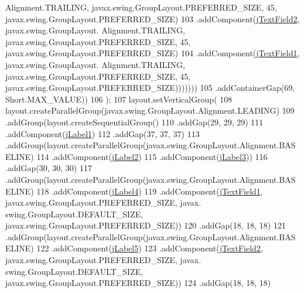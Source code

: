 \begin{DoxyCode}
      Alignment.TRAILING, javax.swing.GroupLayout.PREFERRED\_SIZE, 45, javax.swing.GroupLayout.PREFERRED\_SIZE)
103                                         .addComponent(\mbox{\hyperlink{classsoftware_1_1ponernotas_a3cc94d5b5bd1181f042f71bcbe418e5f}{jTextField2}}, javax.swing.GroupLayout.
      Alignment.TRAILING, javax.swing.GroupLayout.PREFERRED\_SIZE, 45, javax.swing.GroupLayout.PREFERRED\_SIZE)
104                                         .addComponent(\mbox{\hyperlink{classsoftware_1_1ponernotas_a6ea3d65f0c7fddc1b3c983e9ed0e6939}{jTextField1}}, javax.swing.GroupLayout.
      Alignment.TRAILING, javax.swing.GroupLayout.PREFERRED\_SIZE, 45, javax.swing.GroupLayout.PREFERRED\_SIZE)))))))
105                 .addContainerGap(69, Short.MAX\_VALUE))
106         );
107         layout.setVerticalGroup(
108             layout.createParallelGroup(javax.swing.GroupLayout.Alignment.LEADING)
109             .addGroup(layout.createSequentialGroup()
110                 .addGap(29, 29, 29)
111                 .addComponent(\mbox{\hyperlink{classsoftware_1_1ponernotas_ac17144972e22b9105abd7154befd195a}{jLabel1}})
112                 .addGap(37, 37, 37)
113                 .addGroup(layout.createParallelGroup(javax.swing.GroupLayout.Alignment.BASELINE)
114                     .addComponent(\mbox{\hyperlink{classsoftware_1_1ponernotas_ab381c20a9538313f7d4a5b39b0a96325}{jLabel2}})
115                     .addComponent(\mbox{\hyperlink{classsoftware_1_1ponernotas_a35f1e77968f139680ed7404f94dada6f}{jLabel3}}))
116                 .addGap(30, 30, 30)
117                 .addGroup(layout.createParallelGroup(javax.swing.GroupLayout.Alignment.BASELINE)
118                     .addComponent(\mbox{\hyperlink{classsoftware_1_1ponernotas_a85fb8af1244048f39a9d8864e8ef6744}{jLabel4}})
119                     .addComponent(\mbox{\hyperlink{classsoftware_1_1ponernotas_a6ea3d65f0c7fddc1b3c983e9ed0e6939}{jTextField1}}, javax.swing.GroupLayout.PREFERRED\_SIZE, javax.
      swing.GroupLayout.DEFAULT\_SIZE, javax.swing.GroupLayout.PREFERRED\_SIZE))
120                 .addGap(18, 18, 18)
121                 .addGroup(layout.createParallelGroup(javax.swing.GroupLayout.Alignment.BASELINE)
122                     .addComponent(\mbox{\hyperlink{classsoftware_1_1ponernotas_ab1d9cabe505eb0024a31ce142ab2ca0d}{jLabel5}})
123                     .addComponent(\mbox{\hyperlink{classsoftware_1_1ponernotas_a3cc94d5b5bd1181f042f71bcbe418e5f}{jTextField2}}, javax.swing.GroupLayout.PREFERRED\_SIZE, javax.
      swing.GroupLayout.DEFAULT\_SIZE, javax.swing.GroupLayout.PREFERRED\_SIZE))
124                 .addGap(18, 18, 18)

\end{DoxyCode}
